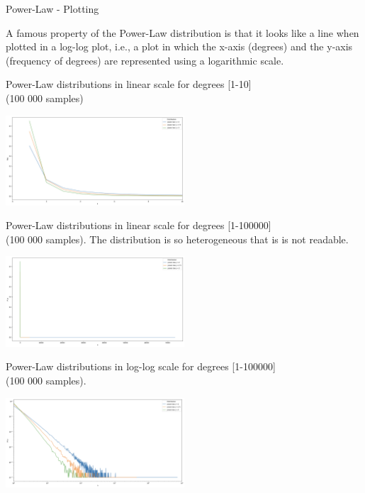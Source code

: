 \documentclass[a4paper,11pt]{book}
\begin{document}
\begin{textbox}{Power-Law - Plotting}

A famous property of the Power-Law distribution is that it looks like a line when plotted in a log-log plot, i.e., a plot in which the x-axis (degrees) and the y-axis (frequency of degrees) are represented using a logarithmic scale.
\begin{center}
Power-Law distributions in linear scale for degrees [1-10] \\
(100 000 samples)

\includegraphics[width=0.5\textwidth]{pics/SF1.png}

Power-Law distributions in linear scale for degrees [1-100000] \\
(100 000 samples). The distribution is so heterogeneous that is is not readable.

\includegraphics[width=0.5\textwidth]{pics/SF2.png}

Power-Law distributions in log-log scale for degrees [1-100000] \\
(100 000 samples).

\includegraphics[width=0.5\textwidth]{pics/SF3.png}
\end{center}

\end{textbox}
\end{document}
